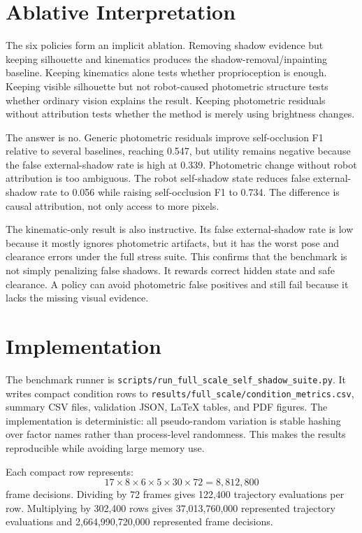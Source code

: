 \documentclass{article}
\begin{document}
\section{Ablative Interpretation}

The six policies form an implicit ablation. Removing shadow evidence but keeping silhouette and kinematics produces the shadow-removal/inpainting baseline. Keeping kinematics alone tests whether proprioception is enough. Keeping visible silhouette but not robot-caused photometric structure tests whether ordinary vision explains the result. Keeping photometric residuals without attribution tests whether the method is merely using brightness changes.

The answer is no. Generic photometric residuals improve self-occlusion F1 relative to several baselines, reaching 0.547, but utility remains negative because the false external-shadow rate is high at 0.339. Photometric change without robot attribution is too ambiguous. The robot self-shadow state reduces false external-shadow rate to 0.056 while raising self-occlusion F1 to 0.734. The difference is causal attribution, not only access to more pixels.

The kinematic-only result is also instructive. Its false external-shadow rate is low because it mostly ignores photometric artifacts, but it has the worst pose and clearance errors under the full stress suite. This confirms that the benchmark is not simply penalizing false shadows. It rewards correct hidden state and safe clearance. A policy can avoid photometric false positives and still fail because it lacks the missing visual evidence.

\section{Implementation}

The benchmark runner is \texttt{scripts/run\_full\_scale\_self\_shadow\_suite.py}. It writes compact condition rows to \texttt{results/full\_scale/condition\_metrics.csv}, summary CSV files, validation JSON, LaTeX tables, and PDF figures. The implementation is deterministic: all pseudo-random variation is stable hashing over factor names rather than process-level randomness. This makes the results reproducible while avoiding large memory use.

Each compact row represents:
\[
17 \times 8 \times 6 \times 5 \times 30 \times 72 = 8{,}812{,}800
\]
frame decisions. Dividing by 72 frames gives 122,400 trajectory evaluations per row. Multiplying by 302,400 rows gives 37,013,760,000 represented trajectory evaluations and 2,664,990,720,000 represented frame decisions.
\end{document}
